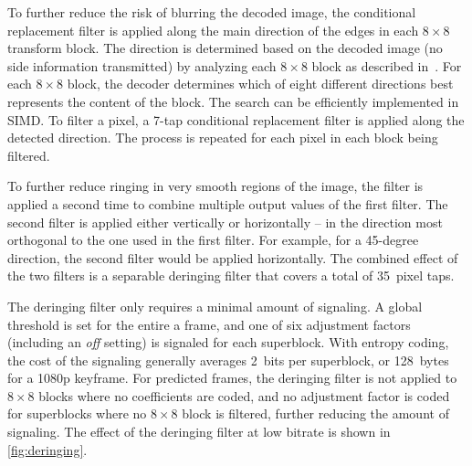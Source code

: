 \documentclass[english,conference,10pt]{IEEEtran}
\begin{document}
To further reduce the risk of blurring the decoded image, the conditional
replacement filter is applied along the main direction of the edges
in each $8\times 8$ transform block. The direction is determined based on the decoded image
(no side information transmitted) by analyzing each $8\times 8$ block as described
in~\cite{ValinDeringing}. For each $8\times 8$ block, the decoder determines which
of eight different directions best represents the content of the block.
The search can be efficiently implemented in SIMD\@. To filter a pixel, a 7-tap
conditional replacement filter is applied along the detected direction.
The process is repeated for each pixel in each block being filtered.

To further reduce ringing in very smooth regions of the image, the filter
is applied a second time to combine multiple output values of the
first filter. The second filter is applied either vertically or horizontally
-- in the direction most orthogonal to the one used in the first filter.
For example, for a 45-degree direction, the second filter would be
applied horizontally. The combined effect of the two filters is a separable
deringing filter that covers a total of 35~pixel taps.

The deringing filter only requires a minimal amount of signaling. A global threshold
is set for the entire a frame, and one of six adjustment factors (including an
\textit{off} setting) is signaled for each superblock. With entropy coding, the
cost of the signaling generally averages 2~bits per superblock, or 128~bytes for
a 1080p keyframe. For predicted frames, the deringing filter is not applied to
$8\times 8$ blocks where no coefficients are coded, and no adjustment factor
is coded for superblocks where no $8\times 8$ block is filtered, further
reducing the amount of signaling. The
effect of the deringing filter at low bitrate is shown in \cref{fig:deringing}.
\end{document}
